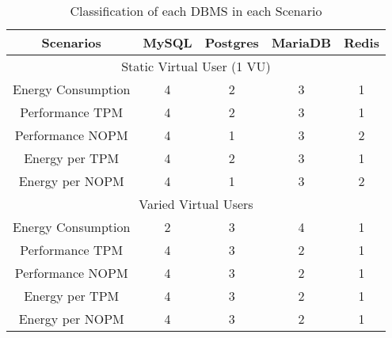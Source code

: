 \begin{table}[H]
\centering
\begin{tabular}{|c|c|c|c|c|}
\hline
Scenarios          & \multicolumn{1}{l|}{MySQL} & \multicolumn{1}{l|}{Postgres} & \multicolumn{1}{l|}{MariaDB} & Redis \\ \hline
\multicolumn{5}{|c|}{Static Virtual User (1 VU)}                                                                       \\ \hline
Energy Consumption & 4                          & 2                             & 3                            & 1     \\ \hline
Performance TPM    & 4                          & 2                             & 3                            & 1     \\ \hline
Performance NOPM   & 4                          & 1                             & 3                            & 2     \\ \hline
Energy per TPM     & 4                          & 2                             & 3                            & 1     \\ \hline
Energy per NOPM    & 4                          & 1                             & 3                            & 2     \\ \hline
\multicolumn{5}{|c|}{Varied Virtual Users}                                                                             \\ \hline
Energy Consumption & 2                          & 3                             & 4                             & 1     \\ \hline
Performance TPM    & 4                          & 3                             & 2                            & 1     \\ \hline
Performance NOPM   & 4                          & 3                             & 2                            & 1     \\ \hline
Energy per TPM     & 4                          & 3                             & 2                            & 1     \\ \hline
Energy per NOPM    & 4                          & 3                             & 2                            & 1     \\ \hline
\end{tabular}
\caption{Classification of each DBMS in each Scenario}
\label{tb:conclusion}
\end{table}